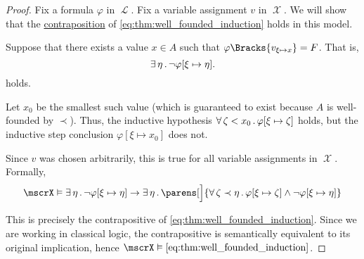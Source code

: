 \begin{proof}
  Fix a formula \( \varphi \) in \( \mscrL \). Fix a variable assignment \( v \) in \( \mscrX \). We will show that the \hyperref[def:material_implication/contrapositive]{contraposition} of \eqref{eq:thm:well_founded_induction} holds in this model.

  Suppose that there exists a value \( x \in A \) such that \( \varphi\Bracks{v_{\xi \mapsto x}} = F \). That is,
  \begin{equation*}
    \exists \thinspace \eta \thinspace . \thinspace \neg \varphi[\xi \mapsto \eta].
  \end{equation*}
  holds.

  Let \( x_0 \) be the smallest such value (which is guaranteed to exist because \( A \) is well-founded by \( \prec \)). Thus, the inductive hypothesis \( \forall \thinspace \zeta < x_0 \thinspace . \thinspace \varphi[\xi \mapsto \zeta] \) holds, but the inductive step conclusion \( \varphi[\xi \mapsto x_0] \) does not.

  Since \( v \) was chosen arbitrarily, this is true for all variable assignments in \( \mscrX \). Formally,
  \begin{equation}\label{eq:thm:well_founded_induction/contraposition}
    \mscrX
    \vDash
    \qexists \eta \neg \varphi[\xi \mapsto \eta]
    \rightarrow
    \qexists \eta
    \parens[\Big]
      {
        \qforall {\zeta \prec \eta} \varphi[\xi \mapsto \zeta] \wedge \neg \varphi[\xi \mapsto \eta]
      }
  \end{equation}

  This is precisely the contrapositive of \eqref{eq:thm:well_founded_induction}. Since we are working in classical logic, the contrapositive is semantically equivalent to its original implication, hence \( \mscrX \vDash \eqref{eq:thm:well_founded_induction} \).
\end{proof}

